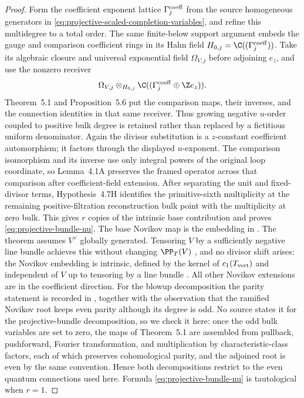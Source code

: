 \begin{proof}
Form the coefficient exponent lattice \(\Gamma_j^{\rm coeff}\) from the
source homogeneous generators in
\eqref{eq:projective-scaled-completion-variables}, and refine this
multidegree to a total order.  The same finite-below support argument embeds
the gauge and comparison coefficient rings in its Hahn field
\(H_{0,j}=\C((\Gamma_j^{\rm coeff}))\).  Take its algebraic closure and
universal exponential
field \(\Omega_{V,j}\) before adjoining \(e_z\), and use the nonzero receiver
\[
 \Omega_{V,j}\otimes_{H_{0,j}}
 \C((\Gamma_j^{\rm coeff}\oplus\Z e_z)).
\]
Theorem~5.1 and Proposition~5.6 put the comparison maps, their inverses, and
the connection identities in that same receiver.
Thus growing negative \(u\)-order coupled to positive bulk degree is
retained rather than replaced by a fictitious uniform denominator.
Again the divisor substitution is a \(z\)-constant coefficient automorphism;
it factors through the displayed \(u\)-exponent.
The comparison isomorphism and its inverse use only integral powers of the
original loop coordinate, so Lemma~4.1A preserves the framed operator across
that comparison after coefficient-field extension.  After separating the unit
and fixed-divisor terms, Hypothesis~4.7H identifies the primitive-sixth
multiplicity at the remaining positive-filtration reconstruction bulk point
with the multiplicity at zero bulk.  This gives \(r\)
copies of the intrinsic base contribution and proves
\eqref{eq:projective-bundle-nu}.  The base Novikov map is the
embedding in \cite[(1.1) and Remark~5.2]{IritaniKoto}.  The theorem assumes
\(V^\vee\) globally generated.  Tensoring \(V\) by a sufficiently negative
line bundle achieves this without changing \(\PP_T(V)\)
\cite[Remark~1.2]{IritaniKoto}, and no divisor shift arises: the Novikov
embedding is intrinsic, defined by the kernel of \(c_1(T_{\rm vert})\) and
independent of \(V\) up to tensoring by a line bundle
\cite[Remark~5.2]{IritaniKoto}.  All other Novikov extensions
are in the coefficient direction.  For the blowup decomposition the parity
statement is recorded in \cite[Section~2]{IritaniNotes}, together with the
observation that the ramified Novikov root keeps even parity although its
degree is odd.  No source states it for the projective-bundle decomposition,
so we check it here: once the odd bulk variables are set to zero, the maps of
Theorem~5.1 are assembled from pullback, pushforward, Fourier transformation,
and multiplication by characteristic-class factors, each of which preserves
cohomological parity, and the adjoined root is even by the same convention.
Hence both decompositions restrict to the even quantum connections used
here.  Formula
\eqref{eq:projective-bundle-nu} is tautological when \(r=1\).
\end{proof}

